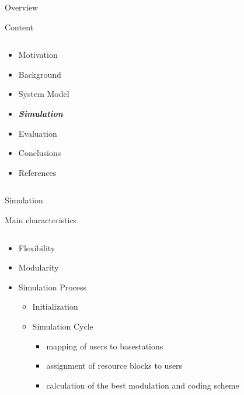 \documentclass[xcolor={cmyk}]{beamer}
\begin{document}
\begin{frame}{Overview}
	\begin{block}{Content}
		\begin{columns}
			\begin{column}{.9\textwidth}
				\begin{itemize}
					\item Motivation
					\item Background
					\item System Model
					\item \textbf{\emph{Simulation}}
					\item Evaluation
					\item Conclusions
					\item References
				\end{itemize}
			\end{column}
		\end{columns}
	\end{block}
\end{frame}

 \begin{frame}{Simulation}
	 \begin{block}{Main characteristics}
	 	\begin{columns}
			\begin{column}{.9\textwidth}
				\begin{itemize}
					\item Flexibility
					\item Modularity
					\item Simulation Process
					\begin{itemize}
						\item Initialization
						\item Simulation Cycle
						\begin{itemize}
							\item mapping of users to basestations
							\item assignment of resource blocks to users
							\item calculation of the best modulation and coding scheme
					 	\end{itemize}
					 \end{itemize}
					
				 \end{itemize}
			\end{column}
		\end{columns}
	 \end{block}
 \end{frame}
 
\end{document}
